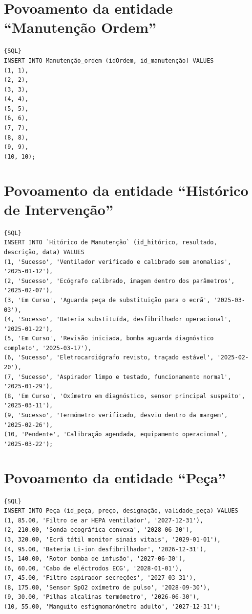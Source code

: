 \section{Povoamento da entidade “Manutenção Ordem”}
{\small
\begin{lstlisting}[breaklines]{SQL}
INSERT INTO Manutenção_ordem (idOrdem, id_manutenção) VALUES
(1, 1),
(2, 2),
(3, 3),
(4, 4),
(5, 5),
(6, 6),
(7, 7),
(8, 8),
(9, 9),
(10, 10);
\end{lstlisting}
}

\section{Povoamento da entidade “Histórico de Intervenção”}
{\small
\begin{lstlisting}[breaklines]{SQL}
INSERT INTO `Hitórico de Manutenção` (id_hitórico, resultado, descrição, data) VALUES
(1, 'Sucesso', 'Ventilador verificado e calibrado sem anomalias', '2025-01-12'),
(2, 'Sucesso', 'Ecógrafo calibrado, imagem dentro dos parâmetros', '2025-02-07'),
(3, 'Em Curso', 'Aguarda peça de substituição para o ecrã', '2025-03-03'),
(4, 'Sucesso', 'Bateria substituída, desfibrilhador operacional', '2025-01-22'),
(5, 'Em Curso', 'Revisão iniciada, bomba aguarda diagnóstico completo', '2025-03-17'),
(6, 'Sucesso', 'Eletrocardiógrafo revisto, traçado estável', '2025-02-20'),
(7, 'Sucesso', 'Aspirador limpo e testado, funcionamento normal', '2025-01-29'),
(8, 'Em Curso', 'Oxímetro em diagnóstico, sensor principal suspeito', '2025-03-11'),
(9, 'Sucesso', 'Termómetro verificado, desvio dentro da margem', '2025-02-26'),
(10, 'Pendente', 'Calibração agendada, equipamento operacional', '2025-03-22');
\end{lstlisting}
}

\section{Povoamento da entidade “Peça”}
{\small
\begin{lstlisting}[breaklines]{SQL}
INSERT INTO Peça (id_peça, preço, designação, validade_peça) VALUES
(1, 85.00, 'Filtro de ar HEPA ventilador', '2027-12-31'),
(2, 210.00, 'Sonda ecográfica convexa', '2028-06-30'),
(3, 320.00, 'Ecrã tátil monitor sinais vitais', '2029-01-01'),
(4, 95.00, 'Bateria Li-ion desfibrilhador', '2026-12-31'),
(5, 140.00, 'Rotor bomba de infusão', '2027-06-30'),
(6, 60.00, 'Cabo de eléctrodos ECG', '2028-01-01'),
(7, 45.00, 'Filtro aspirador secreções', '2027-03-31'),
(8, 175.00, 'Sensor SpO2 oxímetro de pulso', '2028-09-30'),
(9, 30.00, 'Pilhas alcalinas termómetro', '2026-06-30'),
(10, 55.00, 'Manguito esfigmomanómetro adulto', '2027-12-31');
\end{lstlisting}
}

